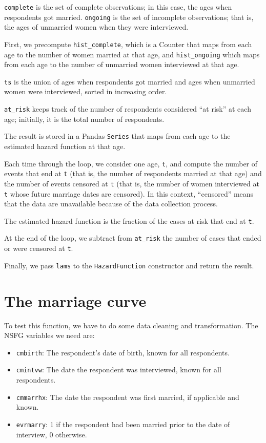 \documentclass[12pt]{book}
\begin{document}
\verb"complete" is the set of complete observations; in this case,
the ages when respondents got married.  \verb"ongoing" is the set
of incomplete observations; that is, the ages of unmarried women
when they were interviewed.

First, we precompute \verb"hist_complete", which is a Counter
that maps from each age to the number of women married at that
age, and \verb"hist_ongoing" which maps from each age to the
number of unmarried women interviewed at that age.


\verb"ts" is the union of ages when respondents got married
and ages when unmarried women were interviewed, sorted in
increasing order.

\verb"at_risk" keeps track of the number of respondents considered
``at risk'' at each age; initially, it is the total number of
respondents.

The result is stored in a Pandas \verb"Series" that maps from
each age to the estimated hazard function at that age.

Each time through the loop, we consider one age, \verb"t",
and compute the number of events that end at \verb"t" (that is,
the number of respondents married at that age) and the number
of events censored at \verb"t" (that is, the number of women
interviewed at \verb"t" whose future marriage dates are
censored).  In this context, ``censored'' means that the
data are unavailable because of the data collection process.

The estimated hazard function is the fraction of the cases
at risk that end at \verb"t".

At the end of the loop, we subtract from \verb"at_risk" the
number of cases that ended or were censored at \verb"t".

Finally, we pass \verb"lams" to the \verb"HazardFunction"
constructor and return the result.



\section{The marriage curve}

To test this function, we have to do some data cleaning and
transformation.  The NSFG variables we need are:

\begin{itemize}

\item \verb"cmbirth": The respondent's date of birth, known for
all respondents.

\item \verb"cmintvw": The date the respondent was interviewed,
known for all respondents.

\item \verb"cmmarrhx": The date the respondent was first married,
if applicable and known.

\item \verb"evrmarry": 1 if the respondent had been
married prior to the date of interview, 0 otherwise.

\end{itemize}
\end{document}
